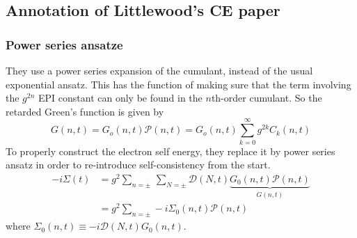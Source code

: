 \subsection{Annotation of Littlewood's CE paper}
\subsubsection{Power series ansatze}
They use a power series expansion of the cumulant, instead of the usual exponential ansatz. This has the function of making sure that the term involving the $g^{2n}$ EPI constant can only be found in the $n$th-order cumulant. So the retarded Green's function is given by
\begin{equation}
    G(n,t) = G_o(n,t) \mathcal{P}(n,t) = G_o(n,t)\sum_{k=0}^\infty g^{2k} C_k(n,t)
\end{equation}
To properly construct the electron self energy, they replace it by power series ansatz in order to re-introduce self-consistency from the start.
\begin{equation}
    \begin{aligned}
        -i\Sigma(t) &= g^2 \sum_{n=\pm}\,\sum_{N= \pm} \mathcal{D}(N,t)\underbrace{G_0(n, t)\mathcal{P}(n,t)}_{G(n,t)}\\
    &=g^2 \sum_{n=\pm}-i\Sigma_0(n,t)\mathcal{P}(n,t)
\end{aligned}
\label{Power corrected self energy}
\end{equation}
where $\Sigma _0(n,t) \equiv -i\mathcal{D}(N,t)G_0(n, t)$.
